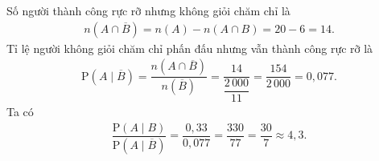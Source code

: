 \begin{ex}
{\begin{itemchoice}
			Số người thành công rực rỡ nhưng không giỏi chăm chỉ là
			\begin{align*}
				n\left(A \cap \overline{B}\right) = n(A) - n(A \cap B) = 20 - 6 = 14.
			\end{align*}
			Tỉ lệ người không giỏi chăm chỉ phấn đấu nhưng vẫn thành công rực rỡ là
			\begin{align*}
				\mathrm{P}\left(A \mid \overline{B}\right) = \dfrac{n\left(A \cap \overline{B}\right)}{n\left(\overline{B}\right)} = \dfrac{14}{\dfrac{2\,000}{11}} = \dfrac{154}{2\,000} = 0{,}077.
			\end{align*}
			Ta có
			\begin{align*}
				\dfrac{\mathrm{P}(A \mid B)}{\mathrm{P}\left(A \mid \overline{B}\right)} = \dfrac{0{,}33}{0{,}077} = \dfrac{330}{77} = \dfrac{30}{7} \approx 4{,}3.
			\end{align*}
		\end{itemchoice}
	}
\end{ex}

